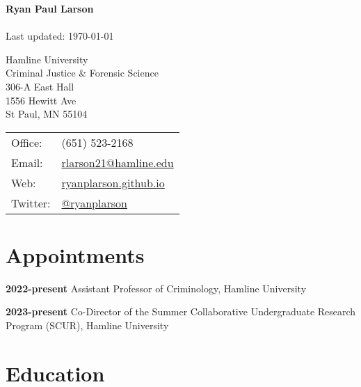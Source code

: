 \documentclass[letterpaper]{article}
\def\name{Ryan Paul Larson}
\newenvironment{publist}{%
  \begin{list}{}{%
    \setlength{\leftmargin}{0cm}   %
    \setlength{\labelwidth}{2cm}     %
    \setlength{\labelsep}{0.5cm}     %
  }%
}{%
  \end{list}%
}
\begin{document}
\textbf{{\huge \name}}\\
\\
Last updated: \today

\vspace{5ex}





\begin{minipage}{0.45\linewidth}
  Hamline University \\
  Criminal Justice \& Forensic Science \\
  306-A East Hall \\
 1556 Hewitt Ave \\
 St Paul, MN 55104
\end{minipage}
\begin{minipage}{0.45\linewidth}
  \begin{tabular}{ll}
    Office: & (651) 523-2168 \\
    Email: & \href{mailto:rlarson21@hamline.edu}{rlarson21@hamline.edu} \\
    Web: & \href{https://ryanplarson.github.io/personal_site/}{ryanplarson.github.io} \\
   Twitter: &  \href{https://twitter.com/ryanplarson}{@ryanplarson} \\
  \end{tabular}
\end{minipage}



\section*{\textbf{Appointments}}


\begin{publist}

\item[\textbf{2022-present}] Assistant Professor of Criminology, Hamline University

\item[\textbf{2023-present}] Co-Director of the Summer Collaborative Undergraduate Research Program (SCUR), Hamline University


\end{publist}



\section*{\textbf{Education}}
\end{document}
